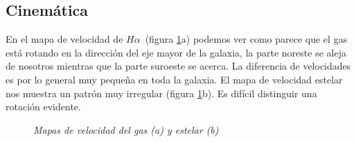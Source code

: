 \documentclass{article}
\newcommand{\hal}{$H\alpha$}
\begin{document}
\subsection{Cinemática}
En el mapa de velocidad de \hal\ (figura \ref{figura 5}a) podemos ver como parece que el gas está rotando en la dirección del eje mayor de la galaxia, la parte noreste se aleja de nosotros mientras que la parte suroeste se acerca. La diferencia de velocidades es por lo general muy pequeña en toda la galaxia. El mapa de velocidad estelar nos muestra un patrón muy irregular (figura \ref{figura 5}b). Es difícil distinguir una rotación evidente.
\begin{figure}[H]
	\centering
	\caption{\emph{Mapas de velocidad del gas (a) y estelar (b)}}
	\label{figura 5}
\end{figure} 
\end{document}
